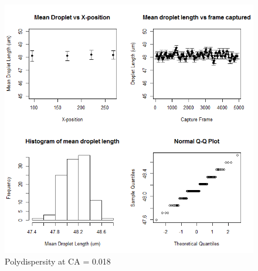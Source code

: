 \begin{figure}[H]
\centering 
\includegraphics[width=01.0\columnwidth]{3_poly.PNG} 
\caption[Polydispersity at CA = 0.018]{Polydispersity at CA = 0.018} 
\label{fig:3_poly} 
\end{figure}


